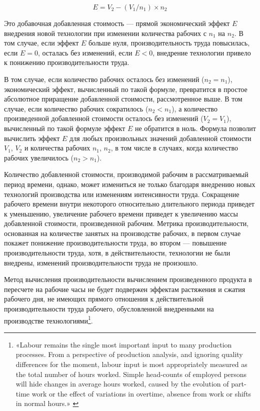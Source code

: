 \documentclass{article}
\begin{document}
$$E = V_2 - (V_1 / n_1) \times n_2$$

Это добавочная добавленная стоимость — прямой экономический эффект $E$ внедрения новой технологии при изменении количества рабочих с $n_1$ на $n_2$. В том случае, если эффект $E$ больше нуля, производительность труда повысилась, если $E = 0$, осталась без изменений, если $E < 0$, внедрение технологии привело к понижению производительности труда.

В том случае, если количество рабочих осталось без изменений ($n_2 = n_1$), экономический эффект, вычисленный по такой формуле, превратится в простое абсолютное приращение добавленной стоимости, рассмотренное выше. В том случае, если количество рабочих сократилось ($n_2 < n_1$), а количество произведенной добавленной стоимости осталось без изменений ($V_2 = V_1$), вычисленный по такой формуле эффект $E$ не обратится в ноль. Формула позволит вычислить эффект $E$ для любых произвольных значений добавленной стоимости $V_1$, $V_2$ и количества рабочих $n_1$, $n_2$, в том числе в случаях, когда количество рабочих увеличилось ($n_2 > n_1$).

Количество добавленной стоимости, производимой рабочим в рассматриваемый период времени, однако, может измениться не только благодаря внедрению новых технологий производства или изменениям интенсивности труда. Сокращение рабочего времени внутри некоторого относительно длительного периода приведет к уменьшению, увеличение рабочего времени приведет к увеличению массы добавленной стоимости, произведенной рабочим. Метрика производительности, основанная на количестве занятых на производстве рабочих, в первом случае покажет понижение производительности труда, во втором — повышение производительности труда, хотя, в действительности, технологии не были внедрены, изменений производительности труда не произошло.

Метод вычисления производительности вычислением произведенного продукта в пересчете на рабочие часы не будет подвержен эффектам растяжения и сжатия рабочего дня, не имеющих прямого отношения к действительной производительности труда рабочего, обусловленной внедренными на производстве технологиями\footnote{«Labour remains the single most important input to many production processes. From a perspective of production analysis, and ignoring quality differences for the moment, labour input is most appropriately measured as the total number of hours worked. Simple head-counts of employed persons will hide changes in average hours worked, caused by the evolution of part-time work or the effect of variations in overtime, absence from work or shifts in normal hours.» \cite{oecdLabourProductivityManual2001}}.
\end{document}
